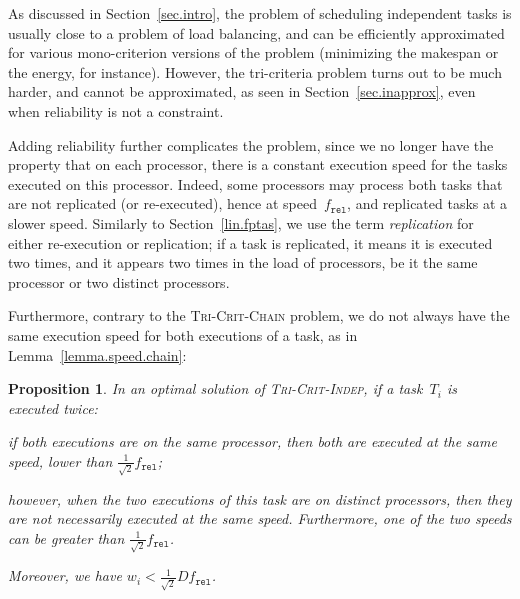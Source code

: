 \documentclass[a4paper]{article}
\theoremstyle{plain}
\newtheorem{proposition}{Proposition}
\theoremstyle{definition}
\theoremstyle{remark}
\newcommand{\fr}{\ensuremath{f_{\texttt{rel}}}\xspace}
\newcommand{\chain}{\textsc{Tri-Crit-Chain}\xspace}
\newcommand{\indep}{\textsc{Tri-Crit-In\-dep}\xspace}
\begin{document}
As discussed in Section~\ref{sec.intro}, the problem of scheduling
independent tasks is usually close to a problem of load balancing, and
can be efficiently approximated for various mono-criterion versions of
the problem (minimizing the makespan or the energy, for instance).  
However, the tri-criteria problem turns out to be much harder, and
cannot be approximated, as seen in Section~\ref{sec.inapprox}, even
when reliability is not a constraint. 

Adding reliability further complicates the problem, since we no longer
have the property that on each processor, there is a constant
execution speed for the tasks executed on this processor. Indeed, some
processors may process both tasks that are not replicated (or
re-executed), hence at speed~\fr, and replicated tasks at a slower
speed.  Similarly to Section~\ref{lin.fptas}, we use the term {\em
  replication} for either re-execution or replication; if a task is
replicated, it means it is executed two times, and it appears two
times in the load of processors, be it the same processor or two
distinct processors.



Furthermore, contrary to the \chain problem, we do not always have the
same execution speed for both executions of a task, as in
Lemma~\ref{lemma.speed.chain}:  
\begin{proposition}
\label{prop.indep}
  In an optimal solution of \indep, if a task~$T_i$ is executed twice:
\begin{compactitem}
    \item if both executions are on the same processor, then both are executed 
at the same speed, lower than $\frac{1}{\sqrt{2}}\fr$;
\item however, when the two executions of this task are on distinct
  processors, then they are not necessarily executed at the same
  speed.  Furthermore, one of the two speeds can be greater than
  $\frac{1}{\sqrt{2}}\fr$.
\end{compactitem}
Moreover, we have $w_i<\frac{1}{\sqrt{2}}D\fr$. 
\end{proposition}
\end{document}
